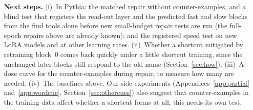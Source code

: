 \textbf{Next steps.} (i)~In Pythia: the matched repair without counter-examples, and a blind test that registers the
read-out layer and the predicted fast and slow blocks from the find tools alone before new small-budget repair tests
are run (the full-epoch repairs above are already known); and the registered
speed test on new LoRA models and at other learning rates. (ii)~Whether a shortcut mitigated by retraining block~0 comes back quickly under a little shortcut training, since
the unchanged later blocks still respond to the old name (Section~\ref{sec:how}). (iii)~A dose curve for the counter-examples during repair, to measure how many are needed. (iv)~The
baselines above. Our side experiments (Appendices~\ref{app:partial} and~\ref{app:wordcue}, Section~\ref{sec:othercues}) also suggest that
counter-examples in the training data affect whether a shortcut forms at all; this needs its own test.

